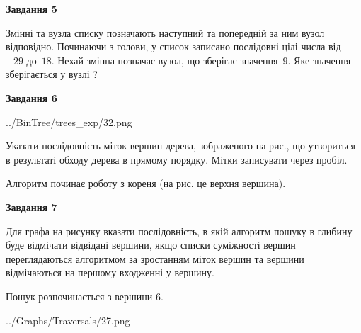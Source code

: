 \documentclass[12pt, ukrainian]{article}
\begin{document}
{\begin {large}
{\begin {center}\textbf{Завдання 5}\end {center}}\par
Змінні  та  вузла списку позначають наступний та попередній за ним вузол відповідно. Починаючи з голови, у список записано послідовні цілі числа від~$-29$ до~$18$. Нехай змінна  позначає вузол, що зберігає значення~$9$.
Яке значення зберігається у вузлі  ?\par
\newpage

{\begin {center}\textbf{Завдання 6}\end {center}}\par

\begin{center}
	{../BinTree/trees_exp/32.png}
\end{center}
Указати послідовність міток вершин дерева, зображеного на рис., що утвориться в результаті обходу дерева в прямому порядку. Мітки записувати через пробіл.\par Алгоритм починає роботу з кореня (на рис. це верхня вершина).\par
\newpage

{\begin {center}\textbf{Завдання 7}\end {center}}\par
Для графа на рисунку вказати послідовність, в якій алгоритм пошуку в глибину буде відмічати відвідані вершини, якщо списки суміжності вершин переглядаються алгоритмом за зростанням міток вершин та вершини відмічаються на першому вход\-женні у вершину.\par
Пошук розпочинається з вершини 6.\par

\begin{center}
	{../Graphs/Traversals/27.png}
\end{center}\par
\newpage


\end{large}}
\end{document}
